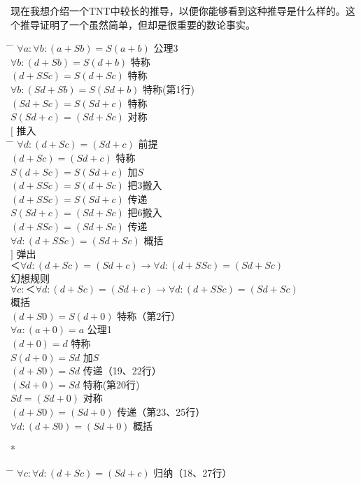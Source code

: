 现在我想介绍一个TNT中较长的推导，以便你能够看到这种推导是什么样的。这个推导证明了一个虽然简单，但却是很重要的数论事实。
\begin{tabbing*}
\qquad\qquad \= \tabindent{-2em} \= \+\kill
$\forall a:\forall b:(a+Sb)=S(a+b)$ \>公理3\\
$\forall b:(d+Sb)=S(d+b)$ \>特称\\
$(d+SSc)=S(d+Sc)$ \>特称\\
$\forall b:(Sd+Sb)=S(Sd+b)$ \>特称(第1行)\\
$(Sd+Sc)=S(Sd+c)$ \>特称\\
$S(Sd+c)=(Sd+Sc)$ \>对称\\
$[$ \>推入\\
\pushtabs
  \quad \= \tabindent{-1em} \= \+\kill
  $\forall d:(d+Sc)=(Sd+c)$ \>前提\\
  $(d+Sc)=(Sd+c)$ \>特称\\
  $S(d+Sc)=S(Sd+c)$ \>加$S$\\
  $(d+SSc)=S(d+Sc)$ \>把3搬入\\
  $(d+SSc)=S(Sd+c)$ \>传递\\
  $S(Sd+c)=(Sd+Sc)$ \>把6搬入\\
  $(d+SSc)=(Sd+Sc)$ \>传递\\
  $\forall d:(d+SSc)=(Sd+Sc)$ \>概括\-\\
\poptabs
$]$ \>弹出\\
$＜\forall d:(d+Sc)=(Sd+c)→\forall d:(d+SSc)=(Sd+Sc)$ \\
  \>幻想规则 \nonumber\\
$\forall c:＜\forall d:(d+Sc)=(Sd+c)→\forall d:(d+SSc)=(Sd+Sc)$ \\
  \>概括 \nonumber\\
$(d+S0)=S(d+0)$ \>特称（第2行）\\
$\forall a:(a+0)=a$ \>公理1\\
$(d+0)=d$ \>特称\\
$S(d+0)=Sd$ \>加$S$\\
$(d+S0)=Sd$ \>传递（19、22行）\\
$(Sd+0)=Sd$ \>特称(第20行)\\
$Sd=(Sd+0)$ \>对称\\
$(d+S0)=(Sd+0)$ \>传递（第23、25行）\\
$\forall d:(d+S0)=(Sd+0)$ \>概括
\end{tabbing*}
\begin{center}
* \quad * \quad * \quad * \quad *
\end{center}
\begin{tabbing*}[]
\qquad\qquad \= \tabindent{-2em} \= \+\kill
$\forall c:\forall d:(d+Sc)=(Sd+c)$ \>归纳（18、27行）
\end{tabbing*}

